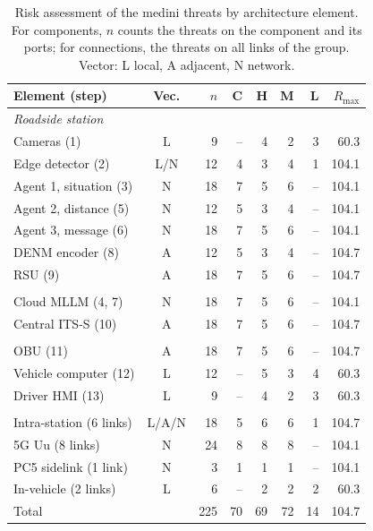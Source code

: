 \begin{table}[htbp]
\centering
\caption{Risk assessment of the medini threats by architecture element. For
components, $n$ counts the threats on the component and its ports; for
connections, the threats on all links of the group. Vector: L local,
A adjacent, N network.}
\label{tab:risk_medini}
\footnotesize
\setlength{\tabcolsep}{3.2pt}
\begin{tabularx}{\columnwidth}{Xcrrrrrr}
\toprule
\textbf{Element (step)} & \textbf{Vec.} & \textbf{$n$} & \textbf{C} & \textbf{H} & \textbf{M} & \textbf{L} & \textbf{$R_{\max}$} \\
\midrule
\multicolumn{8}{l}{\textit{Roadside station}} \\
\quad Cameras (1) & L & 9 & -- & 4 & 2 & 3 & 60.3 \\
\quad Edge detector (2) & L/N & 12 & 4 & 3 & 4 & 1 & 104.1 \\
\quad Agent 1, situation (3) & N & 18 & 7 & 5 & 6 & -- & 104.1 \\
\quad Agent 2, distance (5) & N & 12 & 5 & 3 & 4 & -- & 104.1 \\
\quad Agent 3, message (6) & N & 18 & 7 & 5 & 6 & -- & 104.1 \\
\quad DENM encoder (8) & A & 12 & 5 & 3 & 4 & -- & 104.7 \\
\quad RSU (9) & A & 18 & 7 & 5 & 6 & -- & 104.7 \\
\addlinespace[2pt]
\multicolumn{8}{l}{\textit{Cloud and back end}} \\
\quad Cloud MLLM (4, 7) & N & 18 & 7 & 5 & 6 & -- & 104.1 \\
\quad Central ITS-S (10) & A & 18 & 7 & 5 & 6 & -- & 104.7 \\
\addlinespace[2pt]
\multicolumn{8}{l}{\textit{Vehicle}} \\
\quad OBU (11) & A & 18 & 7 & 5 & 6 & -- & 104.7 \\
\quad Vehicle computer (12) & L & 12 & -- & 5 & 3 & 4 & 60.3 \\
\quad Driver HMI (13) & L & 9 & -- & 4 & 2 & 3 & 60.3 \\
\addlinespace[2pt]
\multicolumn{8}{l}{\textit{Connections}} \\
\quad Intra-station (6 links) & L/A/N & 18 & 5 & 6 & 6 & 1 & 104.7 \\
\quad 5G Uu (8 links) & N & 24 & 8 & 8 & 8 & -- & 104.1 \\
\quad PC5 sidelink (1 link) & N & 3 & 1 & 1 & 1 & -- & 104.1 \\
\quad In-vehicle (2 links) & L & 6 & -- & 2 & 2 & 2 & 60.3 \\
\midrule
Total & & 225 & 70 & 69 & 72 & 14 & 104.7 \\
\bottomrule
\end{tabularx}
\end{table}

